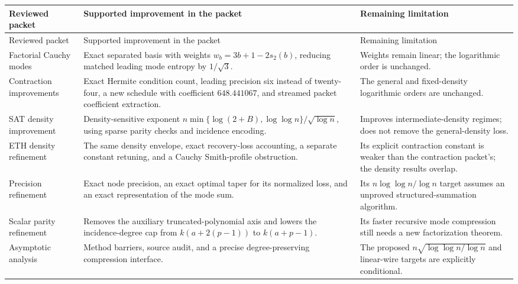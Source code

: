 \documentclass[11pt,letterpaper]{article}
\numberwithin{equation}{section}
\theoremstyle{definition}\newtheorem{definition}[theorem]{Definition}
\theoremstyle{remark}\newtheorem{remark}[theorem]{Remark}
\begin{document}
\begingroup\small
\begin{longtable}{@{}>{\raggedright\arraybackslash}p{.21\linewidth}>{\raggedright\arraybackslash}p{.43\linewidth}>{\raggedright\arraybackslash}p{.29\linewidth}@{}}
\toprule
Reviewed packet & Supported improvement in the packet & Remaining limitation\\
\midrule\endfirsthead
\toprule Reviewed packet & Supported improvement in the packet & Remaining limitation\\\midrule\endhead
Factorial Cauchy modes~\cite{cauchypacket} & Exact separated basis with weights $w_b=3b+1-2s_2(b)$, reducing matched leading mode entropy by $1/\sqrt3$. & Weights remain linear; the logarithmic order is unchanged.\\[.6em]
Contraction improvements~\cite{contractionpacket} & Exact Hermite condition count, leading precision six instead of twenty-four, a new schedule with coefficient $648.441067$, and streamed packet coefficient extraction. & The general and fixed-density logarithmic orders are unchanged.\\[.6em]
SAT density improvement~\cite{satdensity} & Density-sensitive exponent $n\min\{\log(2+B),\log\log n\}/\sqrt{\log n}$, using sparse parity checks and incidence encoding. & Improves intermediate-density regimes; does not remove the general-density loss.\\[.6em]
ETH density refinement~\cite{ethdensity} & The same density envelope, exact recovery-loss accounting, a separate constant retuning, and a Cauchy Smith-profile obstruction. & Its explicit contraction constant is weaker than the contraction packet's; the density results overlap.\\[.6em]
Precision refinement~\cite{precisionpacket} & Exact node precision, an exact optimal taper for its normalized loss, and an exact representation of the mode sum. & Its $n\log\log n/\log n$ target assumes an unproved structured-summation algorithm.\\[.6em]
Scalar parity refinement~\cite{scalarpacket} & Removes the auxiliary truncated-polynomial axis and lowers the incidence-degree cap from $k(a+2(p-1))$ to $k(a+p-1)$. & Its faster recursive mode compression still needs a new factorization theorem.\\[.6em]
Asymptotic analysis~\cite{asymptoticpacket} & Method barriers, source audit, and a precise degree-preserving compression interface. & The proposed $n\sqrt{\log\log n/\log n}$ and linear-wire targets are explicitly conditional.\\
\bottomrule
\end{longtable}
\endgroup
\end{document}
